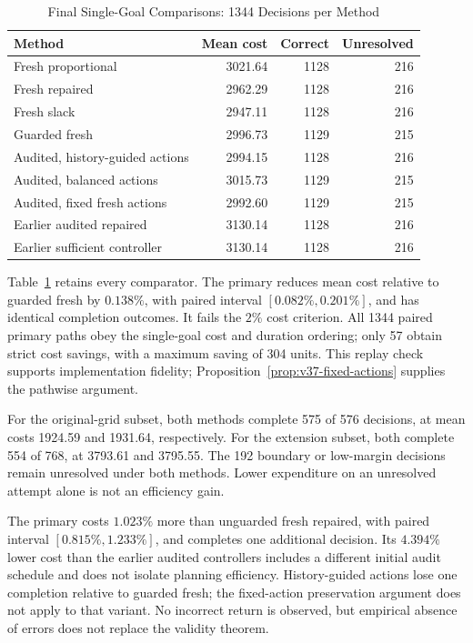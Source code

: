 \begin{table}[t]
\caption{Final Single-Goal Comparisons: 1344 Decisions per Method}
\label{tab:v37-methods}
\centering\footnotesize
\begin{tabular}{lrrr}
\toprule
Method & Mean cost & Correct & Unresolved\\
\midrule
Fresh proportional & 3021.64 & 1128 & 216\\
Fresh repaired & 2962.29 & 1128 & 216\\
Fresh slack & 2947.11 & 1128 & 216\\
Guarded fresh & 2996.73 & 1129 & 215\\
Audited, history-guided actions & 2994.15 & 1128 & 216\\
Audited, balanced actions & 3015.73 & 1129 & 215\\
Audited, fixed fresh actions & 2992.60 & 1129 & 215\\
Earlier audited repaired & 3130.14 & 1128 & 216\\
Earlier sufficient controller & 3130.14 & 1128 & 216\\
\bottomrule
\end{tabular}
\end{table}

Table~\ref{tab:v37-methods} retains every comparator. The primary reduces mean cost relative to guarded fresh by $0.138\%$, with paired interval $[0.082\%,0.201\%]$, and has identical completion outcomes. It fails the $2\%$ cost criterion. All 1344 paired primary paths obey the single-goal cost and duration ordering; only 57 obtain strict cost savings, with a maximum saving of 304 units. This replay check supports implementation fidelity; Proposition~\ref{prop:v37-fixed-actions} supplies the pathwise argument.

For the original-grid subset, both methods complete 575 of 576 decisions, at mean costs 1924.59 and 1931.64, respectively. For the extension subset, both complete 554 of 768, at 3793.61 and 3795.55. The 192 boundary or low-margin decisions remain unresolved under both methods. Lower expenditure on an unresolved attempt alone is not an efficiency gain.

The primary costs $1.023\%$ more than unguarded fresh repaired, with paired interval $[0.815\%,1.233\%]$, and completes one additional decision. Its $4.394\%$ lower cost than the earlier audited controllers includes a different initial audit schedule and does not isolate planning efficiency. History-guided actions lose one completion relative to guarded fresh; the fixed-action preservation argument does not apply to that variant. No incorrect return is observed, but empirical absence of errors does not replace the validity theorem.

